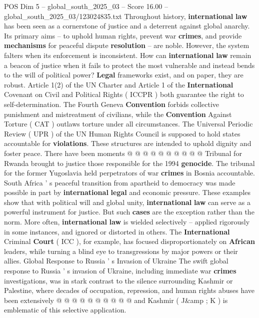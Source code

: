 \begin{textsample}{POS Dim 5 – global\_south\_2025\_03 – Score 16.00 – global\_south\_2025\_03/123024835.txt}  \label{ex:f5_pos_181}
Throughout history, \textbf{international} \textbf{law} has been seen as a cornerstone of justice and a deterrent against global anarchy.
Its primary aims -- to uphold human rights, prevent war \textbf{crimes}, and provide \textbf{mechanisms} for peaceful dispute \textbf{resolution} -- are noble.
However, the system falters when its enforcement is inconsistent.
How can \textbf{international} \textbf{law} remain a beacon of justice when it fails to protect the most vulnerable and instead bends to the will of political power? \textbf{Legal} frameworks exist, and on paper, they are robust.
Article 1(2) of the UN Charter and Article 1 of the \textbf{International} Covenant on Civil and Political Rights ( ICCPR ) both guarantee the right to self-determination.
The Fourth Geneva \textbf{Convention} forbids collective punishment and mistreatment of civilians, while the \textbf{Convention} Against Torture ( CAT ) outlaws torture under all circumstances.
The Universal Periodic Review ( UPR ) of the UN Human Rights Council is supposed to hold states accountable for \textbf{violations}.
These structures are intended to uphold dignity and foster peace.
There have been moments @ @ @ @ @ @ @ @ @ @ Tribunal for Rwanda brought to justice those responsible for the 1994 \textbf{genocide}.
The tribunal for the former Yugoslavia held perpetrators of war \textbf{crimes} in Bosnia accountable.
South Africa ' s peaceful transition from apartheid to democracy was made possible in part by \textbf{international} \textbf{legal} and economic pressure.
These examples show that with political will and global unity, \textbf{international} \textbf{law} can serve as a powerful instrument for justice.
But such \textbf{cases} are the exception rather than the norm.
More often, \textbf{international} \textbf{law} is wielded selectively -- applied rigorously in some instances, and ignored or distorted in others.
The \textbf{International} Criminal \textbf{Court} ( ICC ), for example, has focused disproportionately on \textbf{African} leaders, while turning a blind eye to transgressions by major powers or their allies.
Global Response to Russia ' s Invasion of Ukraine The swift global response to Russia ' s invasion of Ukraine, including immediate war \textbf{crimes} investigations, was in stark contrast to the silence surrounding Kashmir or Palestine, where decades of occupation, repression, and human rights abuses have been extensively @ @ @ @ @ @ @ @ @ @ and Kashmir ( J\&amp ; K ) is emblematic of this selective application.

\end{textsample}
